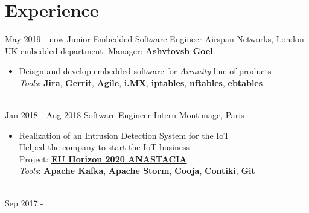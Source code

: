 \documentclass[letterpaper]{twentysecondcv} %
\begin{document}
\makeprofile %


\section{Experience}

\begin{twenty} %
    \twentyitem
    	{May 2019 -}
		{now}
        {Junior Embedded Software Engineer}
        {\href{https://www.airspan.com/}{Airspan Networks, London}}
        {UK embedded department. Manager: \textbf{Ashvtovsh Goel}}
        {
            \begin{itemize}
                \item Deisgn and develop embedded software for \textit{Airunity} line of products\\
                \textit{Tools}: \textbf{Jira}, \textbf{Gerrit}, \textbf{Agile}, \textbf{i.MX}, \textbf{iptables}, \textbf{nftables}, \textbf{ebtables}
            \end{itemize}
        }\\
    \twentyitem
    	{Jan 2018 -}
		{Aug 2018}
        {Software Engineer Intern}
        {\href{https://www.montimage.com/}{Montimage, Paris}}
        {}
        {
            \begin{itemize}
                \item Realization of an Intrusion Detection System for the IoT\\
                Helped the company to start the IoT business\\
                Project: \href{http://www.anastacia-h2020.eu/}{\textbf{EU Horizon 2020 ANASTACIA}}\\
                \textit{Tools}: \textbf{Apache Kafka}, \textbf{Apache Storm}, \textbf{Cooja}, \textbf{Contiki}, \textbf{Git}
            \end{itemize}
        }\\
    \twentyitem
   		{Sep 2017 -}

\end{twenty}
\end{document}
